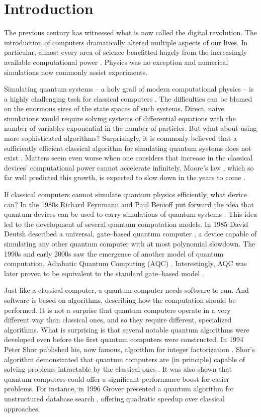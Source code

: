 \chapter*{Introduction}
The previous century has witnessed what is now called the digital revolution. The introduction of
computers dramatically altered multiple aspects of our lives. In particular, almost every area of
science benefitted hugely from the increasingly available computational power \cite{winsberg}.
Physics was no exception and numerical simulations now commonly assist experiments.

Simulating quantum systems -- a holy grail of modern computational physics -- is a highly
challenging task for classical computers \cite{feynman.82}. The difficulties can be blamed on the
enormous sizes of the state spaces of such systems. Direct, naive simulations would require solving
systems of differential equations with the number of variables exponential in the number of
particles. But what about using more sophisticated algorithms? Surprisingly, it is commonly believed
that a sufficiently efficient classical algorithm for simulating quantum systems does not exist
\cite{feynman.82, poplavskii}. Matters seem even worse when one considers that increase in the
classical devices' computational power cannot accelerate infinitely. Moore's law \cite{mack}, which
so far well predicted this growth, is expected to slow down in the years to come \cite{waldrop,
kumar}.

If classical computers cannot simulate quantum physics efficiently, what device can? In the 1980s
Richard Feynmann and Paul Benioff put forward the idea that quantum devices can be used to carry
simulations of quantum systems \cite{feynman.82,benioff.80}. This idea led to the development of
several quantum computation models. In 1985 David Deutsh described a universal, gate--based quantum
computer \cite{deutsch}, a device capable of simulating any other quantum computer with at most
polynomial slowdown. The 1990s and early 2000s saw the emergence of another model of quantum
computation, Adiabatic Quantum Computing (AQC) \cite{kadowaki,farhi}. Interestingly, AQC was later
proven to be equivalent to the standard gate--based model \cite{aharonov}.

Just like a classical computer, a quantum computer needs software to run. And software is based on
algorithms, describing how the computation should be performed. It is not a surprise that quantum
computers operate in a very different way than classical ones, and so they require different,
specialized algorithms. What is surprising is that several notable quantum algorithms were developed
even before the first quantum computers were constructed. In 1994 Peter Shor published his, now
famous, algorithm for integer factorization \cite{shor}. Shor's algorithm demonstrated that quantum
computers are (in principle) capable of solving problems intractable by the classical ones
\cite{kleinjung}. It was also shown that quantum computers could offer a significant performance
boost for easier problems. For instance, in 1996 Grover presented a quantum algorithm for
unstructured database search \cite{grover}, offering quadratic speedup over classical approaches. 

